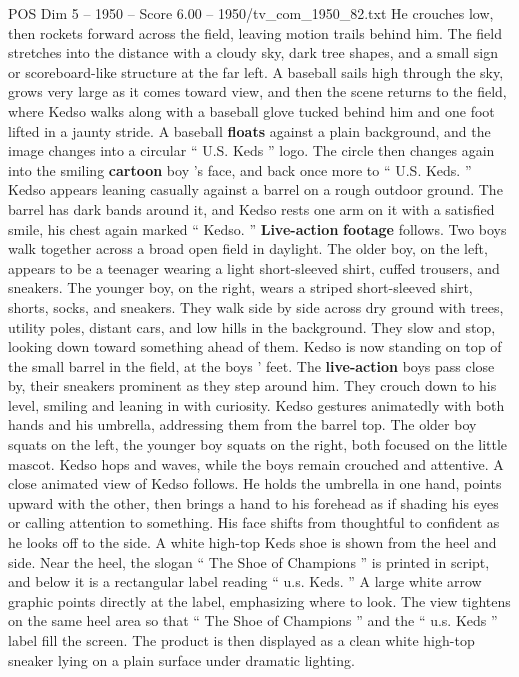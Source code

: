 \begin{textsample}{POS Dim 5 – 1950 – Score 6.00 – 1950/tv\_com\_1950\_82.txt}
He crouches low, then rockets forward across the field, leaving motion trails behind him.
The field stretches into the distance with a cloudy sky, dark tree shapes, and a small sign or scoreboard-like structure at the far left.
A baseball sails high through the sky, grows very large as it comes toward view, and then the scene returns to the field, where Kedso walks along with a baseball glove tucked behind him and one foot lifted in a jaunty stride.
A baseball \textbf{floats} against a plain background, and the image changes into a circular “ U.S.
Keds ” logo.
The circle then changes again into the smiling \textbf{cartoon} boy ’s face, and back once more to “ U.S.
Keds. ” Kedso appears leaning casually against a barrel on a rough outdoor ground.
The barrel has dark bands around it, and Kedso rests one arm on it with a satisfied smile, his chest again marked “ Kedso. ” \textbf{Live-action} \textbf{footage} follows.
Two boys walk together across a broad open field in daylight.
The older boy, on the left, appears to be a teenager wearing a light short-sleeved shirt, cuffed trousers, and sneakers.
The younger boy, on the right, wears a striped short-sleeved shirt, shorts, socks, and sneakers.
They walk side by side across dry ground with trees, utility poles, distant cars, and low hills in the background.
They slow and stop, looking down toward something ahead of them.
Kedso is now standing on top of the small barrel in the field, at the boys ’ feet.
The \textbf{live-action} boys pass close by, their sneakers prominent as they step around him.
They crouch down to his level, smiling and leaning in with curiosity.
Kedso gestures animatedly with both hands and his umbrella, addressing them from the barrel top.
The older boy squats on the left, the younger boy squats on the right, both focused on the little mascot.
Kedso hops and waves, while the boys remain crouched and attentive.
A close animated view of Kedso follows.
He holds the umbrella in one hand, points upward with the other, then brings a hand to his forehead as if shading his eyes or calling attention to something.
His face shifts from thoughtful to confident as he looks off to the side.
A white high-top Keds shoe is shown from the heel and side.
Near the heel, the slogan “ The Shoe of Champions ” is printed in script, and below it is a rectangular label reading “ u.s.
Keds. ” A large white arrow graphic points directly at the label, emphasizing where to look.
The view tightens on the same heel area so that “ The Shoe of Champions ” and the “ u.s.
Keds ” label fill the screen.
The product is then displayed as a clean white high-top sneaker lying on a plain surface under dramatic lighting.

\end{textsample}
